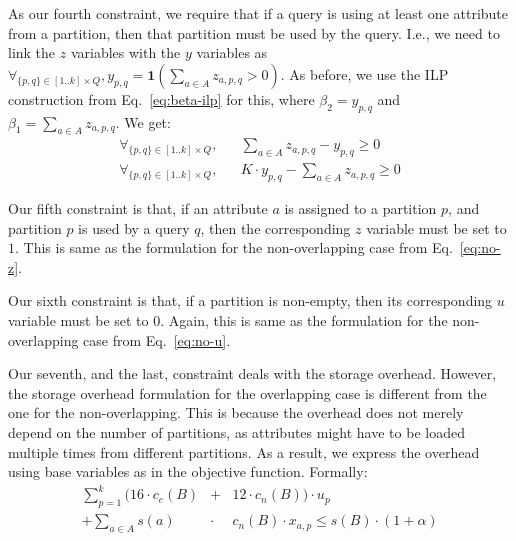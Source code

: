 As our fourth constraint, we require that if a query is using at least one
attribute from a partition, then that partition must be used by the query.
I.e., we need to link the $z$ variables with the $y$ variables as
$\forall_{\{p,q\}\in [1..k]\times Q}, y_{p,q} = \mathbf{1}(\sum_{a\in A}
z_{a,p,q}>0)$. As before, we use the ILP construction from
Eq.~\ref{eq:beta-ilp} for this, where $\beta_2=y_{p,q}$ and $\beta_1 =
\sum_{a\in A} z_{a,p,q}$. We get:
\begin{eqnarray}
\forall_{\{p,q\}\in [1..k]\times Q}, 
    &&  \sum_{a\in A} z_{a,p,q} - y_{p,q} \geq 0 \nonumber\\
\forall_{\{p,q\}\in [1..k]\times Q}, 
    &&  K\cdot y_{p,q} - \sum_{a\in A} z_{a,p,q} \geq 0 
\end{eqnarray}

Our fifth constraint is that, if an attribute $a$ is assigned to a partition
$p$, and partition $p$ is used by a query $q$, then the corresponding $z$
variable must be set to $1$. This is same as the formulation for the
non-overlapping case from Eq.~\ref{eq:no-z}.

Our sixth constraint is that, if a partition is non-empty, then its
corresponding $u$ variable must be set to $0$. Again, this is same as the
formulation for the non-overlapping case from Eq.~\ref{eq:no-u}.

Our seventh, and the last, constraint deals with the storage overhead. However,
the storage overhead formulation for the overlapping case is different from 
the one for the non-overlapping. This is because the overhead does not merely
depend on the number of partitions, as attributes might have to be loaded
multiple times from different partitions. As a result, we express the overhead
using base variables as in the objective function. Formally:
\begin{eqnarray}
\sum_{p=1}^{k} (16\cdot c_e(B) &+& 12 \cdot c_n(B)) \cdot u_p  \nonumber \\ 
+ \sum_{a\in A} s(a) \!\!&\cdot&\!\! c_n(B)\cdot x_{a,p} \leq s(B)\cdot (1+\alpha)
\end{eqnarray}

